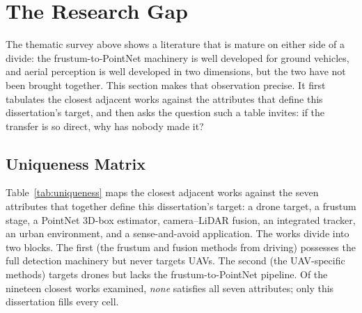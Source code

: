 \section{The Research Gap}
\label{sec:gap}

The thematic survey above shows a literature that is mature on either side of a
divide: the frustum-to-PointNet machinery is well developed for ground vehicles,
and aerial perception is well developed in two dimensions, but the two have not
been brought together. This section makes that observation precise. It first
tabulates the closest adjacent works against the attributes that define this
dissertation's target, and then asks the question such a table invites: if the
transfer is so direct, why has nobody made it?

\subsection{Uniqueness Matrix}

Table~\ref{tab:uniqueness} maps the closest adjacent works against the seven
attributes that together define this dissertation's target: a drone target,
a frustum stage, a PointNet 3D-box estimator, camera--LiDAR fusion, an integrated
tracker, an urban environment, and a sense-and-avoid application. The works
divide into two blocks. The first (the frustum and fusion methods from driving)
possesses the full detection machinery but never targets UAVs. The second (the
UAV-specific methods) targets drones but lacks the frustum-to-PointNet
pipeline. Of the nineteen closest works examined, \emph{none} satisfies all seven
attributes; only this dissertation fills every cell.

